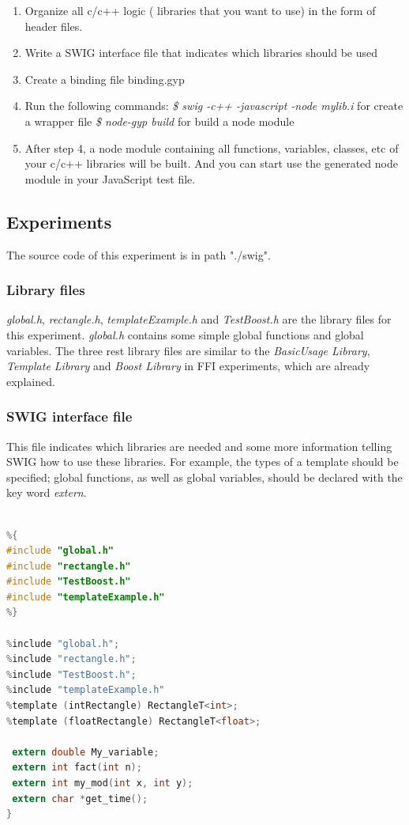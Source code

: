     \begin{enumerate}
        \item Organize all c/c++ logic ( libraries that you want to use) in the form of header files.
        \item Write a SWIG interface file that indicates which libraries should be used
        \item Create a binding file binding.gyp
        \item Run the following commands:\newline
        \textit{\$ swig -c++ -javascript -node mylib.i} for create a wrapper file\newline
        \textit{\$ node-gyp build} for build a node module
        \item After step 4, a node module containing all functions, variables, classes, etc of your c/c++ libraries will be built. And you can start use the generated node module in 
        your JavaScript test file.
    \end{enumerate}


\subsection{Experiments}
The source code of this experiment is in path "./swig".

\subsubsection{Library files}
\textit{global.h}, \textit{rectangle.h}, \textit{templateExample.h} and \textit{TestBoost.h} are the library files for this experiment. \textit{global.h} contains some simple global functions and global variables. The three rest library files are similar to the \textit{BasicUsage Library}, \textit{Template Library} and \textit{Boost Library} in FFI experiments, which are already explained.

\subsubsection{SWIG interface file}
This file indicates which libraries are needed and some more information telling SWIG how to use these libraries. For example, the types of a template should be specified; global functions, as well as global variables, should be declared with the key word \textit{extern}. 


 \begin{lstlisting}[language=c, caption= SWIG interface file]
%module "mylib"

%{
#include "global.h"
#include "rectangle.h"
#include "TestBoost.h"
#include "templateExample.h"
%}

%include "global.h";
%include "rectangle.h";
%include "TestBoost.h";
%include "templateExample.h"
%template (intRectangle) RectangleT<int>;
%template (floatRectangle) RectangleT<float>;

 extern double My_variable;
 extern int fact(int n);
 extern int my_mod(int x, int y);
 extern char *get_time();
}
    \end{lstlisting}

